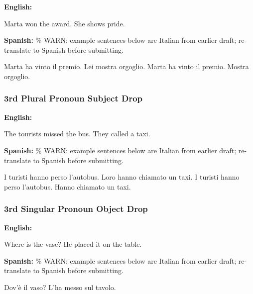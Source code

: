 \documentclass[12pt]{article}
\begin{document}
\begin{exe}
    \ex \textbf{English:}
    \begin{xlist}
        \ex Marta won the award. She shows pride.
    \end{xlist}
    \ex \textbf{Spanish:} \% WARN: example sentences below are Italian from earlier draft; re-translate to Spanish before submitting.
    \begin{xlist}
        \ex Marta ha vinto il premio. Lei mostra orgoglio.
        \ex Marta ha vinto il premio. Mostra orgoglio.
    \end{xlist}
\end{exe}

\subsubsection{3rd Plural Pronoun Subject Drop}

\begin{exe}
    \ex \textbf{English:}
    \begin{xlist}
        \ex The tourists missed the bus. They called a taxi.
    \end{xlist}
    \ex \textbf{Spanish:} \% WARN: example sentences below are Italian from earlier draft; re-translate to Spanish before submitting.
    \begin{xlist}
        \ex I turisti hanno perso l'autobus. Loro hanno chiamato un taxi.
        \ex I turisti hanno perso l'autobus. Hanno chiamato un taxi.
    \end{xlist}
\end{exe}

\subsubsection{3rd Singular Pronoun Object Drop}

\begin{exe}
    \ex \textbf{English:}
    \begin{xlist}
        \ex Where is the vase? He placed it on the table.
    \end{xlist}
    \ex \textbf{Spanish:} \% WARN: example sentences below are Italian from earlier draft; re-translate to Spanish before submitting.
    \begin{xlist}
        \ex Dov'\`e il vaso? L'ha messo sul tavolo.
    \end{xlist}
\end{exe}
\end{document}
